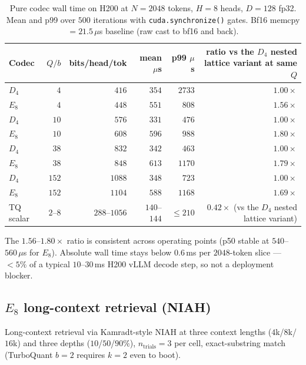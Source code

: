 \documentclass[10pt,a4paper]{article}
\theoremstyle{definition}
\theoremstyle{plain}
\begin{document}
\begin{table}[H]
\centering
\small
\caption{Pure codec wall time on H200 at $N = 2048$ tokens,
$H = 8$ heads, $D = 128$ fp32. Mean and p99 over $500$ iterations
with \texttt{cuda.synchronize()} gates. Bf16 memcpy $= 21.5\,\mu$s
baseline (raw cast to bf16 and back).}
\label{tab:latency}
\begin{tabular}{lrrrrr}
  \toprule
  Codec & $Q / b$ & bits/head/tok & mean $\mu$s & p99 $\mu$s & ratio vs the $D_4$ nested lattice variant at same $Q$ \\
  \midrule
  $D_4$  & $4$   & $416$  & $354$ & $2733$ & $1.00\times$ \\
  $E_8$  & $4$   & $448$  & $551$ & $808$  & $\mathbf{1.56\times}$ \\
  $D_4$  & $10$  & $576$  & $331$ & $476$  & $1.00\times$ \\
  $E_8$  & $10$  & $608$  & $596$ & $988$  & $\mathbf{1.80\times}$ \\
  $D_4$  & $38$  & $832$  & $342$ & $463$  & $1.00\times$ \\
  $E_8$  & $38$  & $848$  & $613$ & $1170$ & $1.79\times$ \\
  $D_4$  & $152$ & $1088$ & $348$ & $723$  & $1.00\times$ \\
  $E_8$  & $152$ & $1104$ & $588$ & $1168$ & $1.69\times$ \\
  \midrule
  TQ scalar    & $2$--$8$  & $288$--$1056$ & $140$--$144$ & $\leq 210$ & $0.42\times$ (vs the $D_4$ nested lattice variant) \\
  \bottomrule
\end{tabular}
\end{table}

The $1.56$--$1.80\times$ ratio is consistent across operating
points (p50 stable at $540$--$560\,\mu$s for $E_8$). Absolute wall
time stays below $0.6\,$ms per $2048$-token slice --- $<5\%$ of a
typical $10$--$30\,$ms H200 vLLM decode step, so not a deployment
blocker.

\subsection{$E_8$ long-context retrieval (NIAH)}
\label{sec:v15-niah}

Long-context retrieval via Kamradt-style NIAH at three context
lengths ($4$k/$8$k/$16$k) and three depths ($10$/$50$/$90\%$),
$n_\mathrm{trials}=3$ per cell, exact-substring match (TurboQuant
$b=2$ requires $k=2$ even to boot).
\end{document}

